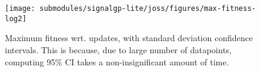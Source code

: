 \begin{figure}[h]

\centering
\texttt{[image: submodules/signalgp-lite/joss/figures/max-fitness-log2]}

\caption{%
Maximum fitness wrt. updates, with standard deviation confidence intervals.
This is because, due to large number of datapoints, computing 95\% CI takes a non-insignificant amount of time.
} \label{fig:max-fitness-sd}

\end{figure}
